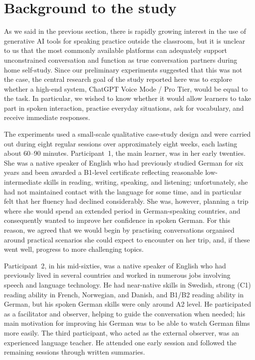 \documentclass[11pt,a4paper]{article}
\begin{document}
\section{Background to the study}

As we said in the previous section, there is rapidly growing interest in the use of generative AI tools for speaking practice outside the classroom, but it is unclear to us that the most commonly available platforms can adequately support unconstrained conversation and function as true conversation partners during home self-study. Since our preliminary experiments suggested that this was not the case, the central research goal of the study reported here was to explore whether a high-end system, ChatGPT Voice Mode / Pro Tier, would be equal to the task. In particular, we wished to know whether it would allow learners to take part in spoken interaction, practise everyday situations, ask for vocabulary, and receive immediate responses.

The experiments used a small-scale qualitative case-study design and were carried out during eight regular sessions over approximately eight weeks, each lasting about 60--90 minutes. Participant~1, the main learner, was in her early twenties. She was a native speaker of English who had previously studied German for six years and been awarded a B1-level certificate reflecting reasonable low-intermediate skills in reading, writing, speaking, and listening; unfortunately, she had not maintained contact with the language for some time, and in particular felt that her fluency had declined considerably. She was, however, planning a trip where she would spend an extended period in German-speaking countries, and consequently wanted to improve her confidence in spoken German. For this reason, we agreed that we would begin by practising conversations organised around practical scenarios she could expect to encounter on her trip, and, if these went well, progress to more challenging topics.

Participant~2, in his mid-sixties, was a native speaker of English who had previously lived in several countries and worked in numerous jobs involving speech and language technology. He had near-native skills in Swedish, strong (C1) reading ability in French, Norwegian, and Danish, and B1/B2 reading ability in German, but his spoken German skills were only around A2 level. He participated as a facilitator and observer, helping to guide the conversation when needed; his main motivation for improving his German was to be able to watch German films more easily. The third participant, who acted as the external observer, was an experienced language teacher. He attended one early session and followed the remaining sessions through written summaries.
\end{document}
